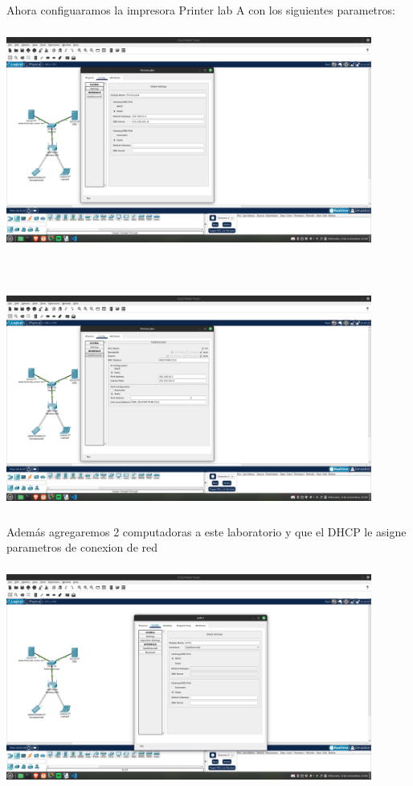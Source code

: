 \documentclass[14pt]{book}
\begin{document}
Ahora configuaramos la impresora Printer lab A con los siguientes parametros:\\

\includegraphics[width=12cm, height=8cm]{images/impresoralaba.png}

\includegraphics[width=12cm, height=8cm]{images/impresoralaba2.png}\\

Además agregaremos 2 computadoras a este laboratorio y que el DHCP le asigne parametros de conexion de red\\

\includegraphics[width=12cm, height=8cm]{images/compus laba.png}\\
\end{document}

